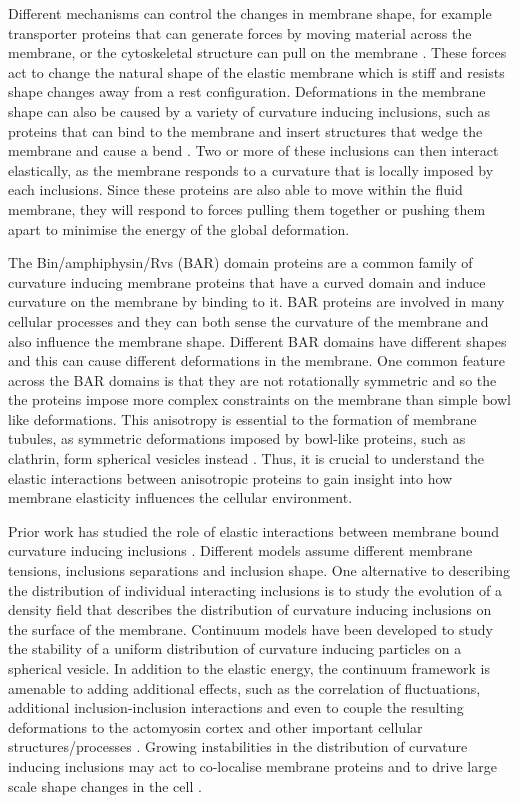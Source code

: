 Different mechanisms can control the changes in membrane shape, for example transporter proteins that can generate forces by moving material across the membrane, or the cytoskeletal structure can pull on the membrane \cite{ghosh_pattern_2021}. These forces act to change the natural shape of the elastic membrane which  is stiff and resists shape changes away from a rest configuration. Deformations in the membrane shape can also be caused by a variety of curvature inducing inclusions, such as proteins that can bind to the membrane and insert structures that wedge the membrane and cause a bend \cite{simunovic_when_2015, argudo_continuum_2016}. Two or more of these inclusions can then interact elastically, as the membrane responds to a curvature that is locally imposed by each inclusions. Since these proteins are also able to move within the fluid membrane, they will respond to forces pulling them together or pushing them apart to minimise the energy of the global deformation.

The Bin/amphiphysin/Rvs (BAR) domain proteins are a common family of curvature inducing membrane proteins that have a curved domain and induce curvature on the membrane by binding to it. BAR proteins are involved in many cellular processes and they can both sense the curvature of the membrane and also influence the membrane shape. Different BAR domains have different shapes and this can cause different deformations in the membrane. One common feature across the BAR domains is that they are not rotationally symmetric and so the the proteins impose more complex constraints on the membrane than simple bowl like deformations. This anisotropy is essential to the formation of membrane tubules, as symmetric deformations imposed by bowl-like proteins, such as clathrin, form spherical vesicles instead \cite{simunovic_when_2015}. Thus, it is crucial to understand the elastic interactions between anisotropic proteins to gain insight into how membrane elasticity influences the cellular environment.

Prior work has studied the role of elastic interactions between membrane bound curvature inducing inclusions \cite{argudo_continuum_2016, helfrich_elastic_1973, kim_curvature-mediated_1998, brown_elastic_2008}. Different models assume different membrane tensions, inclusions separations and inclusion shape. One alternative to describing the distribution of individual interacting inclusions is to study the evolution of a density field that describes the distribution of curvature inducing inclusions on the surface of the membrane. Continuum models \cite{agudo-canalejo_pattern_2017} have been developed to study the stability of a uniform distribution of curvature inducing particles on a spherical vesicle. In addition to the elastic energy, the continuum framework is amenable to adding additional effects, such as the correlation of fluctuations, additional inclusion-inclusion interactions and even to couple the resulting deformations to the actomyosin cortex and other important cellular structures/processes \cite{ghosh_pattern_2021}. Growing instabilities in the distribution of curvature inducing inclusions may act to co-localise membrane proteins and to drive large scale shape changes in the cell \cite{garcia-lara_supramolecular_2015}.

